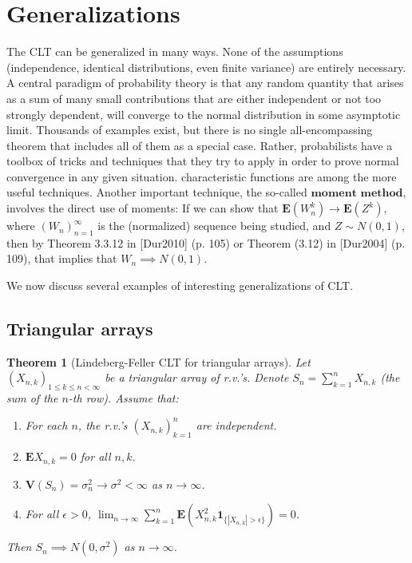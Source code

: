 \documentclass[11pt]{report}
\theoremstyle{plain}
\newtheorem{thm}{Theorem}[chapter]
\theoremstyle{definition}
\begin{document}
\section{Generalizations}

The CLT can be generalized in many ways. None of the
assumptions (independence, identical distributions,
even finite variance) are entirely necessary. A
central paradigm of probability theory is that any
random quantity that arises as a sum of many small
contributions that are either independent or not too
strongly dependent, will converge to the normal
distribution in some asymptotic limit. Thousands of
examples exist, but there is no single
all-encompassing theorem that includes all of them as
a special case. Rather, probabilists have a toolbox of
tricks and techniques that they try to apply in order
to prove normal convergence in any given situation.
characteristic functions are among the more useful
techniques. Another important technique, the so-called
$\textbf{moment method}$, involves the direct use of
moments: If we can show that
$\mathbf{E}(W_n^k)\to \mathbf{E}(Z^k)$, where
$(W_n)_{n=1}^\infty$ is the (normalized) sequence
being studied, and $Z\sim N(0,1)$, then by Theorem
3.3.12 in [Dur2010] (p. 105) or Theorem (3.12) in
[Dur2004] (p. 109), that implies that
$W_n\implies N(0,1)$.

We now discuss several examples of interesting
generalizations of CLT.

\subsection{Triangular arrays}

\begin{thm}[Lindeberg-Feller CLT for triangular arrays]
\label{thm-lindeberg-feller}
Let $(X_{n,k})_{1\le k\le n<\infty}$ be a triangular
array of r.v.'s. Denote $S_n = \sum_{k=1}^n X_{n,k}$
(the sum of the $n$-th row). Assume that:

\begin{enumerate}[label=\arabic*.]
\item For each $n$, the r.v.'s $(X_{n,k})_{k=1}^n$ are
independent.

\item $\mathbf{E} X_{n,k}=0$ for all $n,k$.

\item $\mathbf{V}(S_n) = \sigma_n^2 \to \sigma^2<\infty$ as
$n\to\infty$.

\item For all $\epsilon>0$,
${\displaystyle \lim_{n\to\infty}} \sum_{k=1}^n
\mathbf{E}\left( X_{n,k}^2
\mathbf{1}_{\{|X_{n,k}|>\epsilon\}}\right)=0$.
\end{enumerate}

\noindent Then $S_n \implies N(0,\sigma^2)$ as $n\to\infty$.
\end{thm}
\end{document}
